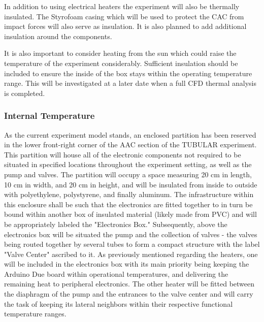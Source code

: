 \begin{centering}
In addition to using electrical heaters the experiment will also be thermally insulated. The Styrofoam casing which will be used to protect the CAC from impact forces will also serve as insulation. It is also planned to add additional insulation around the components.  
\end{centering}

\begin{centering}
It is also important to consider heating from the sun which could raise the temperature of the experiment considerably. Sufficient insulation should be included to ensure the inside of the box stays within the operating temperature range. This will be investigated at a later date when a full CFD thermal analysis is completed.
\end{centering}
\bigskip

\pagebreak


\raggedbottom

\subsubsection{Internal Temperature}

As the current experiment model stands, an enclosed partition has been reserved in the lower front-right corner of the AAC section of the TUBULAR experiment. This partition will house all of the electronic components not required to be situated in specified locations throughout the experiment setting, as well as the pump and valves. The partition will occupy a space measuring 20 cm in length, 10 cm in width, and 20 cm in height, and will be insulated from inside to outside with polyethylene, polystyrene, and finally aluminum. The infrastructure within this enclosure shall be such that the electronics are fitted together to in turn be bound within another box of insulated material (likely made from PVC) and will be appropriately labeled the "Electronics Box." Subsequently, above the electronics box will be situated the pump and the collection of valves - the valves being routed together by several tubes to form a compact structure with the label "Valve Center" ascribed to it. As previously mentioned regarding the heaters, one will be included in the electronics box with its main priority being keeping the Arduino Due board within operational temperatures, and delivering the remaining heat to peripheral electronics. The other heater will be fitted between the diaphragm of the pump and the entrances to the valve center and will carry the task of keeping its lateral neighbors within their respective functional temperature ranges.

